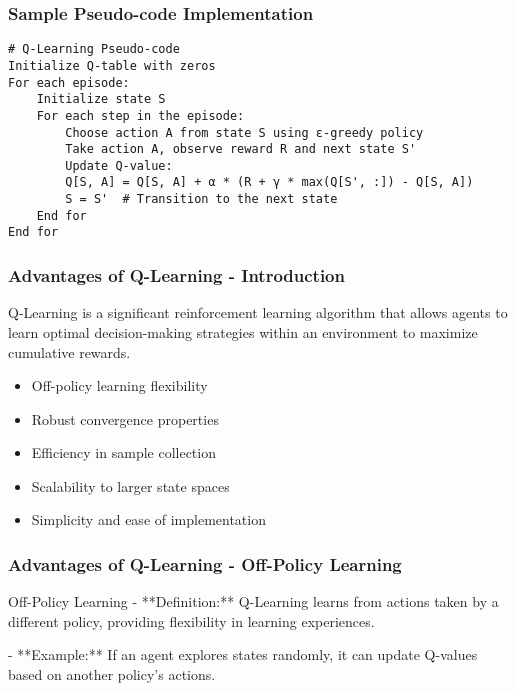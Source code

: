 \documentclass[aspectratio=169]{beamer}
\begin{document}
\begin{frame}[fragile]
    \frametitle{Sample Pseudo-code Implementation}
    \begin{lstlisting}
# Q-Learning Pseudo-code
Initialize Q-table with zeros
For each episode:
    Initialize state S
    For each step in the episode:
        Choose action A from state S using ε-greedy policy
        Take action A, observe reward R and next state S'
        Update Q-value:
        Q[S, A] = Q[S, A] + α * (R + γ * max(Q[S', :]) - Q[S, A])
        S = S'  # Transition to the next state
    End for
End for
    \end{lstlisting}
\end{frame}

\begin{frame}[fragile]
    \frametitle{Advantages of Q-Learning - Introduction}
    Q-Learning is a significant reinforcement learning algorithm that allows agents to learn optimal decision-making strategies within an environment to maximize cumulative rewards.
    \begin{itemize}
        \item Off-policy learning flexibility
        \item Robust convergence properties
        \item Efficiency in sample collection
        \item Scalability to larger state spaces
        \item Simplicity and ease of implementation
    \end{itemize}
\end{frame}

\begin{frame}[fragile]
    \frametitle{Advantages of Q-Learning - Off-Policy Learning}
    \begin{block}{Off-Policy Learning}
        - **Definition:** Q-Learning learns from actions taken by a different policy, providing flexibility in learning experiences.
        
        - **Example:** 
        If an agent explores states randomly, it can update Q-values based on another policy's actions.
    \end{block}
\end{frame}
\end{document}
